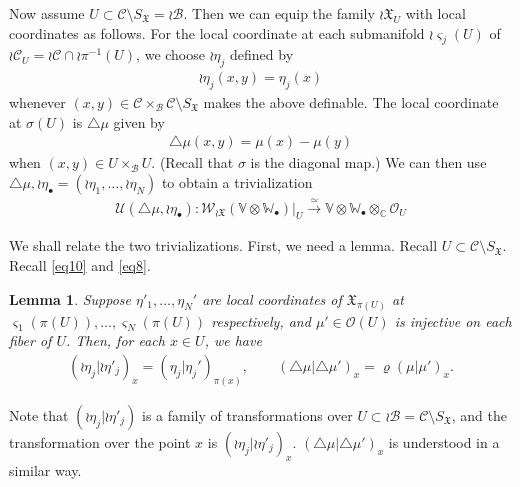 \documentclass[12pt,a4paper,notitlepage]{article}
\theoremstyle{definition}
\theoremstyle{plain}
\newtheorem{lm}[df]{Lemma}
\newcommand{\fk}{\mathfrak}
\newcommand{\mc}{\mathcal}
\newcommand{\scr}{\mathscr}
\newcommand{\sgm}{\varsigma}
\newcommand{\SX}{{S_{\fk X}}}
\newcommand{\blt}{\bullet}
\newcommand{\Vbb}{\mathbb V}
\newcommand{\Wbb}{\mathbb W}
\newcommand{\Cbb}{\mathbb C}
\numberwithin{equation}{section}
\begin{document}
Now assume $U\subset\mc C\setminus\SX=\wr\mc B$. Then we can equip the family $\wr\fk X_U$ with local coordinates as follows. For the local coordinate at each submanifold $\wr\sgm_j(U)$ of $\wr\mc C_U=\wr\mc C\cap\wr\pi^{-1}(U)$, we choose $\wr\eta_j$ defined by 
\begin{gather}
\wr\eta_j(x,y)=\eta_j(x)
\end{gather}
whenever $(x,y)\in\mc C\times_{\mc B}\mc C\setminus\SX$ makes the above definable. The local coordinate at $\sigma(U)$ is $\triangle\mu$ given by  
\begin{align}
\triangle\mu(x,y)=\mu(x)-\mu(y)\label{eq9}
\end{align}
when $(x,y)\in U\times_{\mc B} U$. (Recall that $\sigma$ is the diagonal map.) We can then use $\triangle\mu,\wr\eta_\blt=(\wr\eta_1,\dots,\wr\eta_N)$ to obtain a trivialization
\begin{align}
\boxed{~\mc U(\triangle\mu,\wr\eta_\blt):\scr W_{\wr\fk X}(\Vbb\otimes\Wbb_\blt)|_U\xrightarrow{\simeq} \Vbb\otimes\Wbb_\blt\otimes_\Cbb\scr O_U~}\label{eq17}
\end{align}


We shall relate the two trivializations. First, we need a lemma. Recall $U\subset\mc C\setminus\SX$. Recall \eqref{eq10} and \eqref{eq8}.


\begin{lm}\label{lb3}
Suppose $\eta'_1,\dots,\eta_N'$ are local coordinates of $\fk X_{\pi(U)}$ at $\sgm_1(\pi(U)),\dots,\sgm_N(\pi(U))$ respectively, and $\mu'\in\scr O(U)$ is injective on each fiber of $U$. Then, for each $x\in U$, we have
\begin{gather*}
(\wr\eta_j|\wr\eta'_j)_x=(\eta_j|\eta_j')_{\pi(x)},\qquad (\triangle\mu|\triangle\mu')_x=\varrho(\mu|\mu')_x.
\end{gather*}
\end{lm}

Note that $(\wr\eta_j|\wr\eta'_j)$ is a family of transformations over $U\subset\wr\mc B=\mc C\setminus\SX$, and the transformation over the point $x$ is $(\wr\eta_j|\wr\eta'_j)_x$. $(\triangle\mu|\triangle\mu')_x$ is understood in a similar way.
\end{document}
